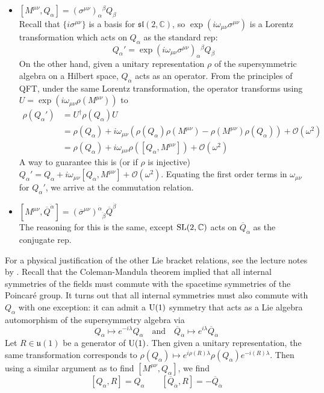 \begin{itemize}
	\item $[M^{\mu\nu}, Q_{\alpha}] 
		= (\sigma^{\mu\nu})_{\alpha}{}^{\beta}Q_\beta $ \\
	Recall that $\{i\sigma^{\mu\nu}\}$ is a basis for
	$\mathfrak{sl}(2,\mathbb{C})$, so $\exp(i\omega_{\mu\nu}\sigma^{\mu\nu})$ is
	a Lorentz transformation which acts on $Q_{\alpha}$ as the standard rep:
	\[
		Q_\alpha' = \exp(i\omega_{\mu\nu}\sigma^{\mu\nu})_{\alpha}{}^{\beta}Q_{\beta}
	\] 
	On the other hand, given a unitary representation $\rho$ of
	the supersymmetric algebra on a Hilbert space, $Q_\alpha$ acts as an operator. 
	From the principles of QFT, under the same Lorentz transformation, the operator 
	transforms using $U = \exp(i\omega_{\mu\nu} \rho(M^{\mu\nu}))$ to 
	\begin{align*}
		\rho(Q_\alpha') &= U^{\dagger} \rho(Q_\alpha) U \\
		&= \rho(Q_\alpha) + i\omega_{\mu\nu}(\rho(Q_\alpha)\rho( M^{\mu\nu}) -
		\rho(M^{\mu\nu})\rho(Q_\alpha)) + \mathcal{O}(\omega^2) \\
		&= \rho(Q_\alpha) + i\omega_{\mu\nu}\rho([Q_\alpha,M^{\mu\nu}]) + \mathcal{O}(\omega^2) 
	\end{align*}
	A way to guarantee this is (or if $\rho$ is injective) $Q_\alpha' = Q_\alpha
	+ i\omega_{\mu\nu}[Q_\alpha,M^{\mu\nu}] + \mathcal{O}(\omega^2)$. 
	Equating the first order terms in
	$\omega_{\mu\nu}$ for $Q_\alpha'$, we arrive at the commutation relation.
	\item $[M^{\mu\nu}, \overline{Q}^{\dot{\alpha}}] = 
		(\overline{\sigma}^{\mu\nu})^{\dot{\alpha}}{}_{\dot{\beta}}
		\overline{Q}^{\dot{\beta}}$\\
	The reasoning for this is the same, except $\operatorname{SL}(2,\mathbb{C})$ acts on
	$\overline{Q}_{\dot{\alpha}}$ as the conjugate rep. 
\end{itemize}
For a physical justification of the other Lie bracket relations, see the lecture
notes by \citet{flipSUSY}. 
Recall that the Coleman-Mandula theorem implied that all internal symmetries of
the fields must commute with the spacetime symmetries of the Poincar\'e group.
It turns out that all internal symmetries must also commute with $Q_\alpha$ with 
one exception:  %
it can admit a $\operatorname{U}(1)$ symmetry that acts as a Lie algebra automorphism of the
supersymmetry algebra via
\[
	Q_\alpha \mapsto e^{-i\lambda}Q_\alpha \quad\text{and}\quad
	\overline{Q}_{\dot{\alpha}} \mapsto e^{i\lambda} \overline{Q}_{\dot{\alpha}}
\] 
Let $R\in \mathfrak{u}(1)$ be a generator of  $\operatorname{U}(1)$. Then given a unitary
representation, the same transformation corresponds to 
$\rho(Q_\alpha) \mapsto e^{i\rho(R)\lambda} \rho(Q_\alpha) e^{-i(R)\lambda}$. 
Then using a similar argument as to find $[M^{\mu\nu}, Q_{\alpha}]$, we find
\[
	[Q_\alpha,R] = Q_\alpha \qquad [\overline{Q}_{\dot{\alpha}}, R] =
	-\overline{Q}_{\dot{\alpha}}
\] 



